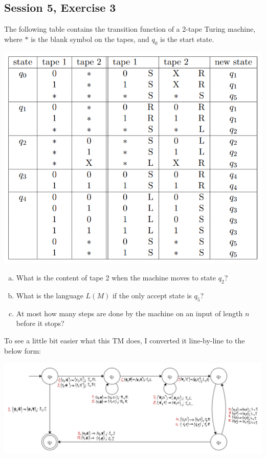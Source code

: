 \subsection {Session 5, Exercise 3}

\label{6_3}


The following table contains the transition function of a 2-tape Turing machine, where $*$ is the blank symbol on the tapes, and $q_0$ is the start state.

\begin{center}
\includegraphics[width=0.7\linewidth]{05/6_3_task.png}
\end{center}

\begin{enumerate}[a)]
    \item What is the content of tape 2 when the machine moves to state $q_2$?
    \item What is the language $L(M)$ if the only accept state is $q_5$?
    \item At most how many steps are done by the machine on an input of length $n$ before it stops?
\end{enumerate}


To see a little bit easier what this TM does, I converted it line-by-line to the below form:

\includegraphics[width=\linewidth]{05/6_3_canvas.png}

